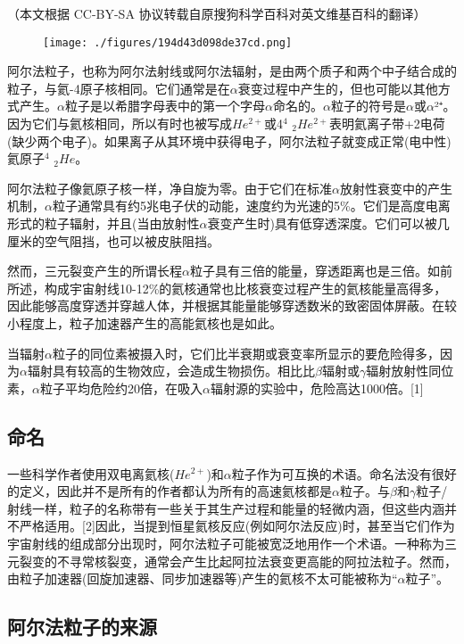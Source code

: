 
（本文根据 CC-BY-SA 协议转载自原搜狗科学百科对英文维基百科的翻译）
\begin{figure}[ht]
\centering
\texttt{[image: ./figures/194d43d098de37cd.png]}
\caption\label{fig_ALZ_6}
\end{figure}

阿尔法粒子，也称为阿尔法射线或阿尔法辐射，是由两个质子和两个中子结合成的粒子，与氦-4原子核相同。它们通常是在$\alpha$衰变过程中产生的，但也可能以其他方式产生。$\alpha$粒子是以希腊字母表中的第一个字母$\alpha$命名的。$\alpha$粒子的符号是$\alpha$或$\alpha$²⁺。因为它们与氦核相同，所以有时也被写成$He^{2+}$或4$^4$ $_2He^{2+}$表明氦离子带+2电荷(缺少两个电子)。如果离子从其环境中获得电子，阿尔法粒子就变成正常(电中性)氦原子$^4$ $_2He$。

阿尔法粒子像氦原子核一样，净自旋为零。由于它们在标准$\alpha$放射性衰变中的产生机制，$\alpha$粒子通常具有约5兆电子伏的动能，速度约为光速的5\%。它们是高度电离形式的粒子辐射，并且(当由放射性$\alpha$衰变产生时)具有低穿透深度。它们可以被几厘米的空气阻挡，也可以被皮肤阻挡。

然而，三元裂变产生的所谓长程$\alpha$粒子具有三倍的能量，穿透距离也是三倍。如前所述，构成宇宙射线10-12\%的氦核通常也比核衰变过程产生的氦核能量高得多，因此能够高度穿透并穿越人体，并根据其能量能够穿透数米的致密固体屏蔽。在较小程度上，粒子加速器产生的高能氦核也是如此。

当辐射$\alpha$粒子的同位素被摄入时，它们比半衰期或衰变率所显示的要危险得多，因为$\alpha$辐射具有较高的生物效应，会造成生物损伤。相比比$\beta$辐射或$\gamma$辐射放射性同位素，$\alpha$粒子平均危险约20倍，在吸入$\alpha$辐射源的实验中，危险高达1000倍。[1]

\subsection{命名}
一些科学作者使用双电离氦核($He^{2+}$)和$\alpha$粒子作为可互换的术语。命名法没有很好的定义，因此并不是所有的作者都认为所有的高速氦核都是$\alpha$粒子。与$\beta$和$\gamma$粒子/射线一样，粒子的名称带有一些关于其生产过程和能量的轻微内涵，但这些内涵并不严格适用。[2]因此，当提到恒星氦核反应(例如阿尔法反应)时，甚至当它们作为宇宙射线的组成部分出现时，阿尔法粒子可能被宽泛地用作一个术语。一种称为三元裂变的不寻常核裂变，通常会产生比起阿拉法衰变更高能的阿拉法粒子。然而，由粒子加速器(回旋加速器、同步加速器等)产生的氦核不太可能被称为“$\alpha$粒子”。

\subsection{阿尔法粒子的来源}
